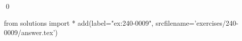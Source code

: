 
\begin{ex} 
  \label{ex:240-0009}
  
  \qed
\end{ex} 
\begin{python0}
from solutions import *
add(label="ex:240-0009",
    srcfilename='exercises/240-0009/answer.tex') 
\end{python0}
